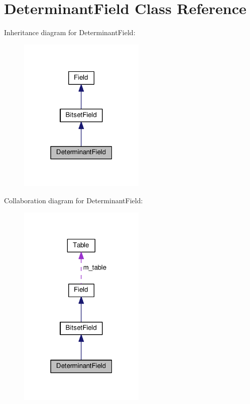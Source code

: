 \hypertarget{classDeterminantField}{}\section{Determinant\+Field Class Reference}
\label{classDeterminantField}


Inheritance diagram for Determinant\+Field\+:\nopagebreak
\begin{figure}[H]
\begin{center}
\leavevmode
\includegraphics[width=171pt]{classDeterminantField__inherit__graph}
\end{center}
\end{figure}


Collaboration diagram for Determinant\+Field\+:\nopagebreak
\begin{figure}[H]
\begin{center}
\leavevmode
\includegraphics[width=171pt]{classDeterminantField__coll__graph}
\end{center}
\end{figure}
